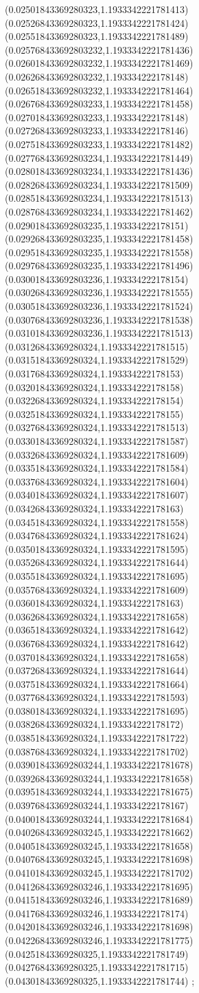 {(0.02501843369280323,1.1933342221781413)
(0.02526843369280323,1.1933342221781424)
(0.02551843369280323,1.1933342221781489)
(0.025768433692803232,1.1933342221781436)
(0.026018433692803232,1.1933342221781469)
(0.026268433692803232,1.193334222178148)
(0.026518433692803232,1.1933342221781464)
(0.026768433692803233,1.1933342221781458)
(0.027018433692803233,1.193334222178148)
(0.027268433692803233,1.193334222178146)
(0.027518433692803233,1.1933342221781482)
(0.027768433692803234,1.1933342221781449)
(0.028018433692803234,1.1933342221781436)
(0.028268433692803234,1.1933342221781509)
(0.028518433692803234,1.1933342221781513)
(0.028768433692803234,1.1933342221781462)
(0.029018433692803235,1.193334222178151)
(0.029268433692803235,1.1933342221781458)
(0.029518433692803235,1.1933342221781558)
(0.029768433692803235,1.1933342221781496)
(0.030018433692803236,1.193334222178154)
(0.030268433692803236,1.1933342221781555)
(0.030518433692803236,1.1933342221781524)
(0.030768433692803236,1.1933342221781538)
(0.031018433692803236,1.1933342221781513)
(0.03126843369280324,1.1933342221781515)
(0.03151843369280324,1.1933342221781529)
(0.03176843369280324,1.193334222178153)
(0.03201843369280324,1.193334222178158)
(0.03226843369280324,1.193334222178154)
(0.03251843369280324,1.193334222178155)
(0.03276843369280324,1.1933342221781513)
(0.03301843369280324,1.1933342221781587)
(0.03326843369280324,1.1933342221781609)
(0.03351843369280324,1.1933342221781584)
(0.03376843369280324,1.1933342221781604)
(0.03401843369280324,1.1933342221781607)
(0.03426843369280324,1.193334222178163)
(0.03451843369280324,1.1933342221781558)
(0.03476843369280324,1.1933342221781624)
(0.03501843369280324,1.1933342221781595)
(0.03526843369280324,1.1933342221781644)
(0.03551843369280324,1.1933342221781695)
(0.03576843369280324,1.1933342221781609)
(0.03601843369280324,1.193334222178163)
(0.03626843369280324,1.1933342221781658)
(0.03651843369280324,1.1933342221781642)
(0.03676843369280324,1.1933342221781642)
(0.03701843369280324,1.1933342221781658)
(0.03726843369280324,1.1933342221781644)
(0.03751843369280324,1.1933342221781664)
(0.03776843369280324,1.1933342221781593)
(0.03801843369280324,1.1933342221781695)
(0.03826843369280324,1.193334222178172)
(0.03851843369280324,1.1933342221781722)
(0.03876843369280324,1.1933342221781702)
(0.039018433692803244,1.1933342221781678)
(0.039268433692803244,1.1933342221781658)
(0.039518433692803244,1.1933342221781675)
(0.039768433692803244,1.193334222178167)
(0.040018433692803244,1.1933342221781684)
(0.040268433692803245,1.1933342221781662)
(0.040518433692803245,1.1933342221781658)
(0.040768433692803245,1.1933342221781698)
(0.041018433692803245,1.1933342221781702)
(0.041268433692803246,1.1933342221781695)
(0.041518433692803246,1.1933342221781689)
(0.041768433692803246,1.193334222178174)
(0.042018433692803246,1.1933342221781698)
(0.042268433692803246,1.1933342221781775)
(0.04251843369280325,1.1933342221781749)
(0.04276843369280325,1.1933342221781715)
(0.04301843369280325,1.1933342221781744)
};
